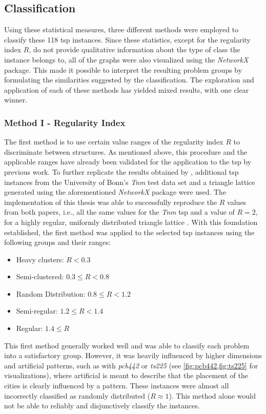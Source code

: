 \subsection{Classification}
\label{chap:classification}

Using these statistical measures, three different methods were employed to classify these 118 \gls{tsp} instances. Since these statistics, except for the regularity index $R$, do not provide qualitative information about the type of class the instance belongs to, all of the graphs were also visualized using the \textit{NetworkX} package. This made it possible to interpret the resulting problem groups by formulating the similarities suggested by the classification. The exploration and application of each of these methods has yielded mixed results, with one clear winner.

\subsubsection{Method I - Regularity Index}

The first method is to use certain value ranges of the regularity index $R$ to discriminate between structures. As mentioned above, this procedure and the applicable ranges have already been validated for the application to the \gls{tsp} by previous work. To further replicate the results obtained by \citet{dry2012clustering, cricsan2021randomness}, additional \gls{tsp} instances from the University of Bonn's \textit{Tnm} test data set \cite{hougardy2021hard} and a triangle lattice generated using the aforementioned \textit{NetworkX} package were used. The implementation of this thesis was able to successfully reproduce the $R$ values from both papers, i.e., all the same values for the \textit{Tnm} \gls{tsp} and a value of $R = 2$, for a highly regular, uniformly distributed triangle lattice \cite{dry2012clustering}.
With this foundation established, the first method was applied to the selected \gls{tsp} instances using the following groups and their ranges:
\begin{itemize}
	\item Heavy clusters:	$R < 0.3$
	\item Semi-clustered: $0.3 \leq R < 0.8$
	\item Random Distribution: $0.8 \leq R < 1.2$
	\item Semi-regular: $1.2 \leq R < 1.4$
	\item Regular: $1.4 \leq R$
\end{itemize}
This first method generally worked well and was able to classify each problem into a satisfactory group. However, it was heavily influenced by higher dimensions and artificial patterns, such as with \textit{pcb442} or \textit{ts225} (see \cref{fig:pcb442,fig:ts225} for visualizations), where artificial is meant to describe that the placement of the cities is clearly influenced by a pattern. These instances were almost all incorrectly classified as randomly distributed ($R\approx1$). 
This method alone would not be able to reliably and disjunctively classify the instances.

